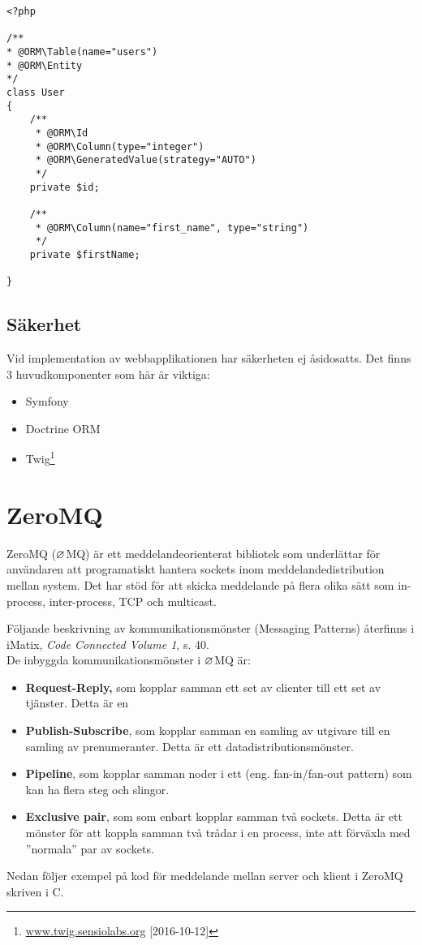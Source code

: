\begin{lstlisting}[caption=Exempel på kod i Symfony, label=symfony]
<?php

/**
* @ORM\Table(name="users")
* @ORM\Entity
*/
class User
{
    /**
     * @ORM\Id
     * @ORM\Column(type="integer")
     * @ORM\GeneratedValue(strategy="AUTO")
     */
    private $id;

    /**
     * @ORM\Column(name="first_name", type="string")
     */
    private $firstName;
    
}
\end{lstlisting}
\subsection*{Säkerhet}
Vid implementation av webbapplikationen har säkerheten ej åsidosatts. Det finns 3 huvudkomponenter som här är viktiga:
\begin{itemize}
\item Symfony
\item Doctrine \acs{ORM}
\item Twig\footnote{\url{www.twig.sensiolabs.org} [2016-10-12]}
\end{itemize}





\newpage
\section{ZeroMQ}
ZeroMQ ($\oldemptyset$MQ)\cite{ZeroMQ-book} är ett meddelandeorienterat bibliotek som underlättar för användaren att programatiskt hantera sockets inom meddelandedistribution mellan system. Det har stöd för att skicka meddelande på flera olika sätt som in-process, inter-process, \acs{TCP} och multicast.

Följande beskrivning av kommunikationsmönster (Messaging Patterns) återfinns i iMatix, \emph{Code Connected Volume 1}, s. 40\cite{ZeroMQ-book}.\\

De inbyggda kommunikationsmönster i $\oldemptyset$MQ är:
\begin{itemize}
    \item{\textbf{Request-Reply,} som kopplar samman ett set av clienter till ett set av tjänster. Detta är en}
    \item{\textbf{Publish-Subscribe}, som kopplar samman en samling av utgivare till en samling av prenumeranter. Detta är ett datadistributionsmönster.}
    \item{\textbf{Pipeline}, som kopplar samman noder i ett (eng. fan-in/fan-out pattern) som kan ha flera steg och slingor.}
    \item{\textbf{Exclusive pair}, som som enbart kopplar samman två sockets. Detta är ett mönster för att koppla samman två trådar i en process, inte att förväxla med ''normala'' par av sockets.}

\end{itemize}
\newpage
Nedan följer exempel på kod för meddelande mellan server och klient i ZeroMQ skriven i C.

